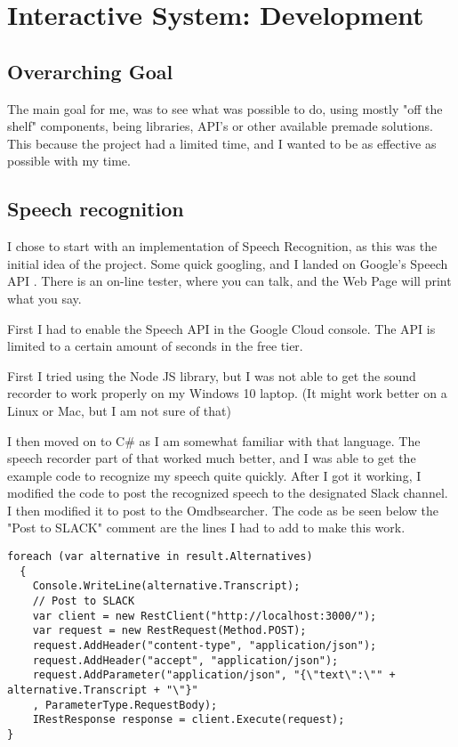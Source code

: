 \documentclass[11pt,fleqn]{book} %
\begin{document}
\chapter{Interactive System: Development}
\section{Overarching Goal}
The main goal for me, was to see what was possible to do, using mostly "off the shelf" components, being libraries, API's or other available premade solutions. This because the project had a limited time, and I wanted to be as effective as possible with my time.
\section{Speech recognition}
I chose to start with an implementation of Speech Recognition, as this was the initial idea of the project.
Some quick googling, and I landed on Google's Speech API \cite{GoogleCloudPlatformSpeechPlatform}. There is an on-line tester, where you can talk, and the Web Page will print what you say.

First I had to enable the Speech API in the Google Cloud console. The API is limited to a certain amount of seconds in the free tier.

First I tried using the Node JS library, but I was not able to get the sound recorder to work properly on my Windows 10 laptop. (It might work better on a Linux or Mac, but I am not sure of that)

I then moved on to C\# as I am somewhat familiar with that language. The speech recorder part of that worked much better, and I was able to get the example code to recognize my speech quite quickly.
After I got it working, I modified the code to post the recognized speech to the designated Slack channel. I then modified it to post to the Omdbsearcher. 
\newpage
The code as be seen below the "Post to SLACK" comment are the lines I had to add to make this work.
\begin{verbatim}
foreach (var alternative in result.Alternatives)
  {
    Console.WriteLine(alternative.Transcript);
    // Post to SLACK
    var client = new RestClient("http://localhost:3000/");
    var request = new RestRequest(Method.POST);
    request.AddHeader("content-type", "application/json");
    request.AddHeader("accept", "application/json");
    request.AddParameter("application/json", "{\"text\":\"" + alternative.Transcript + "\"}"
    , ParameterType.RequestBody);
    IRestResponse response = client.Execute(request);
}
\end{verbatim}
\end{document}
